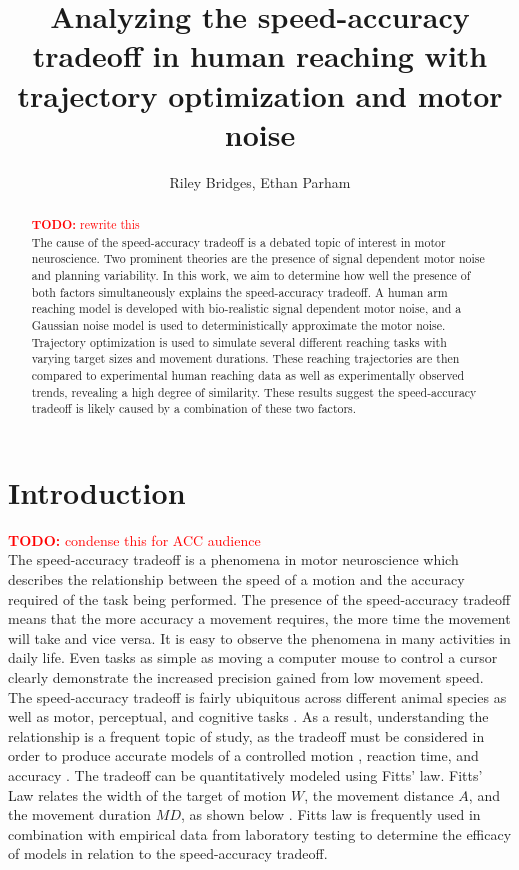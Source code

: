 \documentclass[letterpaper, 10pt, conference]{ieeeconf}
\title{\LARGE \bf Analyzing the speed-accuracy tradeoff in human reaching with trajectory optimization and motor noise}
\author{Riley Bridges, Ethan Parham}
\newcommand{\todo}[1]{\textcolor{red}{\textbf{TODO:} #1}}
\begin{document}
\maketitle
\thispagestyle{plain}
\pagestyle{plain}

\begin{abstract}
\todo{rewrite this} \\
The cause of the speed-accuracy tradeoff is a debated topic of interest in motor neuroscience. Two prominent theories are the presence of signal dependent motor noise and planning variability. In this work, we aim to determine how well the presence of both factors simultaneously explains the speed-accuracy tradeoff. A human arm reaching model is developed with bio-realistic signal dependent motor noise, and a Gaussian noise model is used to deterministically approximate the motor noise. Trajectory optimization is used to simulate several different reaching tasks with varying target sizes and movement durations. These reaching trajectories are then compared to experimental human reaching data as well as experimentally observed trends, revealing a high degree of similarity. These results suggest the speed-accuracy tradeoff is likely caused by a combination of these two factors.
\end{abstract}

\section{Introduction}
\todo{condense this for ACC audience} \\
The speed-accuracy tradeoff is a phenomena in motor neuroscience which describes the relationship between the speed of a motion and the accuracy required of the task being performed. The presence of the speed-accuracy tradeoff means that the more accuracy a movement requires, the more time the movement will take and vice versa. It is easy to observe the phenomena in many activities in daily life. Even tasks as simple as moving a computer mouse to control a cursor clearly demonstrate the increased precision gained from low movement speed. The speed-accuracy tradeoff is fairly ubiquitous across different animal species as well as motor, perceptual, and cognitive tasks \cite{zimmerman_book}. As a result, understanding the relationship is a frequent topic of study, as the tradeoff must be considered in order to produce accurate models of a controlled motion \cite{speed_accuracy_history}, reaction time, and accuracy \cite{hierarchical_speed_accuracy}. The tradeoff can be quantitatively modeled using Fitts’ law. Fitts’ Law relates the width of the target of motion $W$, the movement distance $A$, and the movement duration $MD$, as shown below \cite{fitts_law}. Fitts law is frequently used in combination with empirical data from laboratory testing to determine the efficacy of models in relation to the speed-accuracy tradeoff.  
\end{document}
